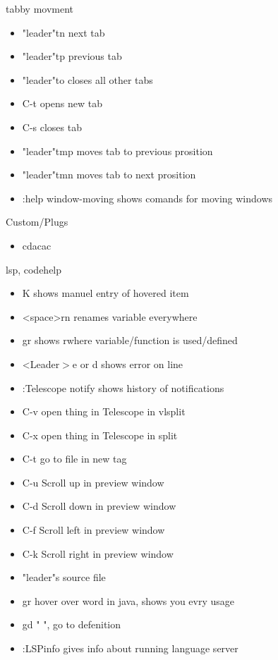 \documentclass[12pt]{article}
\begin{document}
tabby movment 
\begin{itemize}
    \item "leader"tn next tab
    \item "leader"tp previous tab
    \item "leader"to closes all other tabs
    \item C-t opens new tab
    \item C-s closes tab 
    \item "leader"tmp moves tab to previous prosition
    \item "leader"tmn moves tab to next prosition
    \item :help window-moving shows comands for moving windows 
\end{itemize}

Custom/Plugs
\begin{itemize}

    \item  cdacac

\end{itemize}

lsp, codehelp
\begin{itemize}

    \item K shows manuel entry of hovered item
    \item <space>rn renames variable everywhere
    \item gr shows rwhere variable/function is used/defined
    \item <Leader$>$e or d shows error on line
    \item :Telescope notify shows history of notifications 
    \item C-v open thing in Telescope in vlsplit
    \item C-x open thing in Telescope in split
    \item C-t go to file in new tag
    \item C-u 	Scroll up in preview window
    \item C-d 	Scroll down in preview window
    \item C-f 	Scroll left in preview window
    \item C-k 	Scroll right in preview window
    \item "leader"s source file
    \item gr hover over word in java, shows you evry usage
    \item gd "  ", go to defenition
    \item :LSPinfo gives info about running language server 

\end{itemize}
\end{document}
